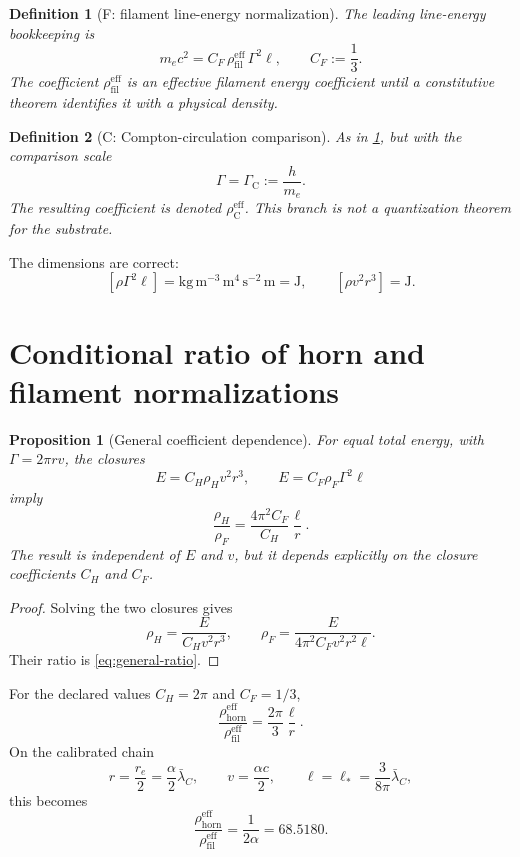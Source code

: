 \documentclass[aps,pre,preprint,notitlepage,nofootinbib,superscriptaddress]{revtex4-2}
\newcommand{\lC}{\bar\lambda_C}
\newcommand{\re}{r_e}
\newcommand{\rhohorn}{\rho_{\mathrm{horn}}^{\mathrm{eff}}}
\newcommand{\rhofil}{\rho_{\mathrm{fil}}^{\mathrm{eff}}}
\newcommand{\rhoCeff}{\rho_{\mathrm C}^{\mathrm{eff}}}
\newcommand{\GammaC}{\Gamma_{\mathrm C}}
\newtheorem{proposition}{Proposition}
\newtheorem{definition}{Definition}
\begin{document}
\begin{definition}[F: filament line-energy normalization]
\label{def:F}
The leading line-energy bookkeeping is
\begin{equation}
  m_ec^2
  =
  C_F\,\rhofil\,\Gamma^2\ell,
  \qquad
  C_F:=\frac13.
  \label{eq:F}
\end{equation}
The coefficient \(\rhofil\) is an effective filament energy coefficient until a constitutive theorem identifies it with a physical density.
\end{definition}

\begin{definition}[C: Compton-circulation comparison]
\label{def:C}
As in \cref{def:F}, but with the comparison scale
\begin{equation}
  \Gamma=\GammaC:=\frac{h}{m_e}.
  \label{eq:C}
\end{equation}
The resulting coefficient is denoted \(\rhoCeff\).  This branch is not a quantization theorem for the substrate.
\end{definition}

The dimensions are correct:
\[
[\rho\Gamma^2\ell]
=
\mathrm{kg\,m^{-3}}\,
\mathrm{m^4\,s^{-2}}\,
\mathrm m
=
\mathrm J,
\qquad
[\rho v^2r^3]=\mathrm J.
\]

\section{Conditional ratio of horn and filament normalizations}
\label{sec:ratio}

\begin{proposition}[General coefficient dependence]
\label{prop:general-ratio}
For equal total energy, with \(\Gamma=2\pi rv\), the closures
\[
E=C_H\rho_Hv^2r^3,
\qquad
E=C_F\rho_F\Gamma^2\ell
\]
imply
\begin{equation}
  \boxed{
  \frac{\rho_H}{\rho_F}
  =
  \frac{4\pi^2C_F}{C_H}\frac{\ell}{r}
  }.
  \label{eq:general-ratio}
\end{equation}
The result is independent of \(E\) and \(v\), but it depends explicitly on the closure coefficients \(C_H\) and \(C_F\).
\end{proposition}

\begin{proof}
Solving the two closures gives
\[
\rho_H=\frac{E}{C_Hv^2r^3},
\qquad
\rho_F
=\frac{E}{4\pi^2C_Fv^2r^2\ell}.
\]
Their ratio is \cref{eq:general-ratio}.
\end{proof}

For the declared values \(C_H=2\pi\) and \(C_F=1/3\),
\begin{equation}
  \frac{\rhohorn}{\rhofil}
  =
  \frac{2\pi}{3}\frac{\ell}{r}.
  \label{eq:specific-ratio}
\end{equation}
On the calibrated chain
\begin{equation}
  r=\frac{\re}{2}
  =\frac{\alpha}{2}\lC,
  \qquad
  v=\frac{\alpha c}{2},
  \qquad
  \ell=\ell_*=\frac{3}{8\pi}\lC,
  \label{eq:calibrated-chain}
\end{equation}
this becomes
\begin{equation}
  \boxed{
  \frac{\rhohorn}{\rhofil}
  =
  \frac{1}{2\alpha}
  =68.5180
  }.
  \label{eq:ratio-alpha}
\end{equation}
\end{document}
